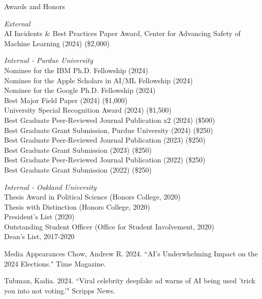 \documentclass{resume} %
\begin{document}
\begin{rSection}{Awards and Honors}

{\it External}
\\AI Incidents \& Best Practices Paper Award, Center for Advancing Safety of Machine Learning (2024) (\$2,000)

{\it Internal - Purdue University}
\\Nominee for the IBM Ph.D. Fellowship (2024)
\\Nominee for the Apple Scholars in AI/ML Fellowship (2024)
\\Nominee for the Google Ph.D. Fellowship (2024)
\\Best Major Field Paper (2024) (\$1,000)
\\University Special Recognition Award (2024) (\$1,500)
\\Best Graduate Peer-Reviewed Journal Publication x2 (2024) (\$500)
\\Best Graduate Grant Submission, Purdue University (2024) (\$250)
\\Best Graduate Peer-Reviewed Journal Publication (2023) (\$250)
\\Best Graduate Grant Submission (2023) (\$250)
\\Best Graduate Peer-Reviewed Journal Publication (2022) (\$250)
\\Best Graduate Grant Submission (2022) (\$250)

{\it Internal - Oakland University}
\\Thesis Award in Political Science (Honors College, 2020)
\\Thesis with Distinction (Honors College, 2020)
\\President’s List (2020)
\\Outstanding Student Officer (Office for Student Involvement, 2020)
\\Dean’s List, 2017-2020 

\end{rSection}

\begin{rSection}{Media Appearances}
Chow, Andrew R. 2024. ``AI’s Underwhelming Impact on the 2024 Elections." Time Magazine. \href{https://time.com/7131271/ai-2024-elections/}{} 

Tubman, Kadia. 2024. ``Viral celebrity deepfake ad warns of AI being used 'trick you into not voting.'" Scripps News. \href{https://www.scrippsnews.com/politics/disinformation-desk/viral-celebrity-deepfake-ad-warns-of-ai-being-used-trick-you-into-not-voting}{} 
    
\end{rSection}
\end{document}

